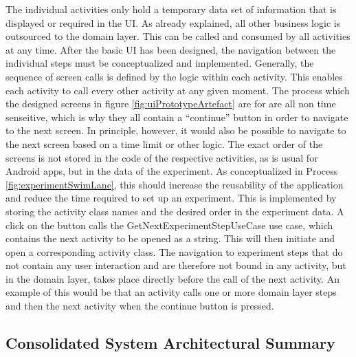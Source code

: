The individual activities only hold a temporary data set of information that is displayed or required in the UI. As already explained, all other business logic is outsourced to the domain layer. This can be called and consumed by all activities at any time. After the basic UI has been designed, the navigation between the individual steps must be conceptualized and implemented. Generally, the sequence of screen calls is defined by the logic within each activity. This enables each activity to call every other activity at any given moment. The process which the designed screens in figure \ref{fig:uiPrototypeArtefact} are for are all non time senseitive, which is why they all contain a \enquote{continue} button in order to navigate to the next screen. In principle, however, it would also be possible to navigate to the next screen based on a time limit or other logic. The exact order of the screens is not stored in the code of the respective activities, as is usual for Android apps, but in the data of the experiment. As conceptualized in Process \ref{fig:experimentSwimLane}, this should increase the reusability of the application and reduce the time required to set up an experiment. This is implemented by storing the activity class names and the desired order in the experiment data. A click on the button calls the GetNextExperimentStepUseCase use case, which contains the next activity to be opened as a string. This will then initiate and open a corresponding activity class. The navigation to experiment steps that do not contain any user interaction and are therefore not bound in any activity, but in the domain layer, takes place directly before the call of the next activity. An example of this would be that an activity calls one or more domain layer steps and then the next activity when the continue button is pressed.

\subsection{Consolidated System Architectural Summary}\label{subsec:completeArchitecture}

